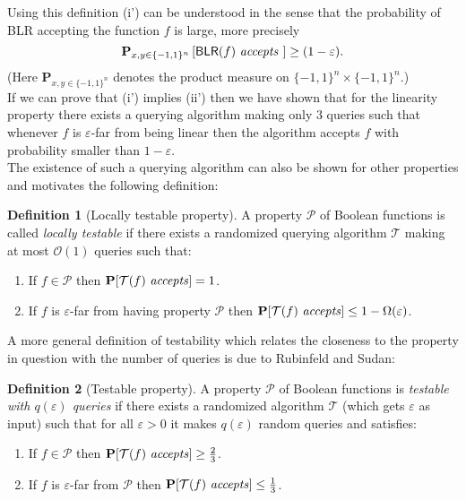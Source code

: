\documentclass[a4paper]{article}
\newcommand{\prob}{\mathbf{P}}
\newcommand{\prty}{\mathcal{P}}
\newcommand{\eps}{\varepsilon}
\theoremstyle{plain}
\theoremstyle{definition}
\newtheorem{definition}{Definition}
\theoremstyle{remark}
\begin{document}
\noindent Using this definition (i') can be understood in the sense
that the probability of \textsf{BLR} accepting the function \(f\) is
large, more precisely \[\prob_{x,y \in \{-1,1\}^n}\left[\textsf{BLR}(f) \text{
    \textit{accepts} }\right] \geq (1-\eps).\]
(Here \(\prob_{x,y \in \{-1,1\}^n}\) denotes the product measure on
\(\{-1,1\}^n \times \{-1,1\}^n\).)\\

\noindent If we can prove that (i') implies (ii') then we have
shown that for the linearity property there exists a querying
algorithm making only \(3\) queries such that whenever \(f\) is
\(\eps\)-far from being linear then the algorithm accepts \(f\) with
probability smaller than \(1-\eps\). \\
The existence of such a querying algorithm can also be shown for other
properties and motivates the following definition: 

\begin{definition}[Locally testable property] \label{def:5}
  A property \(\prty\) of Boolean functions is called \emph{locally
    testable} if there exists a randomized querying algorithm
  \(\mathcal{T}\) making at most \(\mathcal{O}(1)\) queries such that: 
  \begin{enumerate}[label=(\roman*)]
  \item If \(f \in \prty\) then \(\prob[\mathcal{T}(f) \text{ \textit{accepts}}] = 1\).
  \item If \(f\) is \(\eps\)-far from having property \(\prty\) then
    \(\prob[\mathcal{T}(f) \text{ \textit{accepts}}] \leq 1 - \Omega(\eps)\).
  \end{enumerate}
\end{definition}

\noindent A more general definition of testability which relates the
closeness to the property in question with the number of queries is
due to Rubinfeld and Sudan:  

\begin{definition}[Testable property] \label{def:6}
  A property \(\prty\) of Boolean functions is \emph{testable with
    \(q(\eps)\) queries} if there exists a randomized algorithm
  \(\mathcal{T}\) (which gets \(\eps\) as input) such that for all
  \(\eps > 0\) it makes \(q(\eps)\) random queries and satisfies:
  \begin{enumerate}[label=(\roman*)]
  \item If \(f \in \prty\) then \(\prob[\mathcal{T}(f) \text{
      \textit{accepts}}] \geq \frac{2}{3}\).
  \item If \(f\) is \(\eps\)-far from \(\prty\) then \(\prob[\mathcal{T}(f) \text{
      \textit{accepts}}] \leq \frac{1}{3}\).
  \end{enumerate}
\end{definition}
\end{document}
